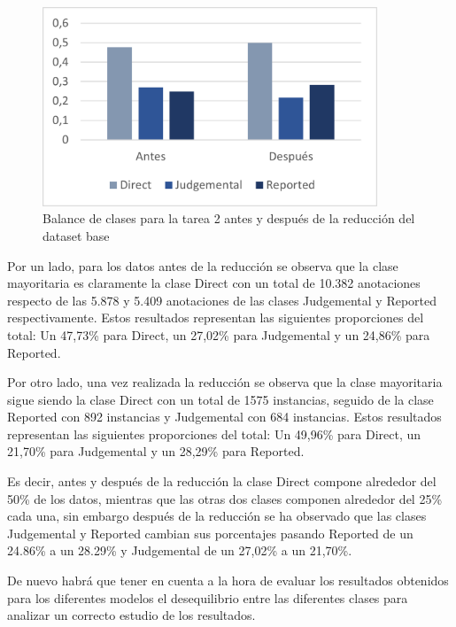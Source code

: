 \begin{figure}[H]
    \centering
    \includegraphics[width=10cm]{imagenes/Evaluacion/dataset_study/task2.png}
    \caption{\centering Balance de clases para la tarea 2 antes y después de la reducción del dataset base}
    \label{balance-task2}
\end{figure}

Por un lado, para los datos antes de la reducción se observa que la clase mayoritaria es claramente la clase Direct con un total de 10.382 anotaciones respecto de las 5.878 y 5.409 anotaciones de las clases Judgemental y Reported respectivamente. Estos resultados representan las siguientes proporciones del total: Un 47,73\% para Direct, un 27,02\% para Judgemental y un 24,86\% para Reported.

Por otro lado, una vez realizada la reducción se observa que la clase mayoritaria sigue siendo la clase Direct con un total de 1575 instancias, seguido de la clase Reported con 892 instancias y Judgemental con 684 instancias. Estos resultados representan las siguientes proporciones del total: Un 49,96\% para Direct, un 21,70\% para Judgemental y un 28,29\% para Reported.

Es decir, antes y después de la reducción la clase Direct compone alrededor del 50\% de los datos, mientras que las otras dos clases componen alrededor del 25\% cada una, sin embargo después de la reducción se ha observado que las clases Judgemental y Reported cambian sus porcentajes pasando Reported de un 24.86\% a un 28.29\% y Judgemental de un 27,02\% a un 21,70\%.

De nuevo habrá que tener en cuenta a la hora de evaluar los resultados obtenidos para los diferentes modelos el desequilibrio entre las diferentes clases para analizar un correcto estudio de los resultados.


